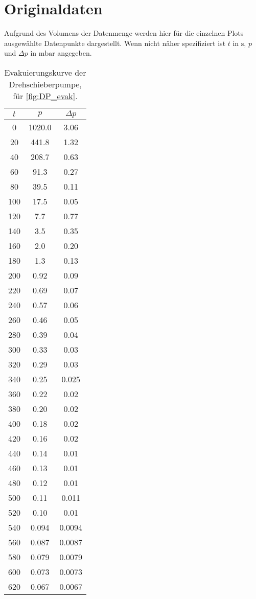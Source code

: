 \section{Originaldaten}
\label{sec:Originaldaten}

Aufgrund des Volumens der Datenmenge werden hier für die einzelnen Plots ausgewählte Datenpunkte dargestellt.
Wenn nicht näher spezifiziert ist $t$ in $\si{\second}$, $p$ und $\Delta p$ in $\si{\milli\bar}$ angegeben. 

\begin{table}[H]
    \centering
    \caption{Evakuierungskurve der Drehschieberpumpe, für  \autoref{fig:DP_evak}.}
    \label{tab:DP_Evak}
    \begin{tabular}{c c c}
        \toprule
        {$t$} & {$p$} & {$\Delta p$} \\
        \midrule
        0 & 1020.0 & 3.06\\
        20 & 441.8 & 1.32\\
        40 & 208.7 & 0.63\\
        60 & 91.3 & 0.27\\
        80 & 39.5 & 0.11\\
        100 & 17.5 & 0.05\\
        120 & 7.7 & 0.77\\
        140 & 3.5 & 0.35\\
        160 & 2.0 & 0.20\\
        180 & 1.3 & 0.13\\
        200 & 0.92 & 0.09\\
        220 & 0.69 & 0.07\\
        240 & 0.57 & 0.06\\
        260 & 0.46 & 0.05\\
        280 & 0.39 & 0.04\\
        300 & 0.33 & 0.03\\
        320 & 0.29 & 0.03\\
        340 & 0.25 & 0.025\\
        360 & 0.22 & 0.02\\
        380 & 0.20 & 0.02\\
        400 & 0.18 & 0.02\\
        420 & 0.16 & 0.02\\
        440 & 0.14 & 0.01\\
        460 & 0.13 & 0.01\\
        480 & 0.12 & 0.01\\
        500 & 0.11 & 0.011\\
        520 & 0.10 & 0.01\\
        540 & 0.094 & 0.0094\\
        560 & 0.087 & 0.0087\\
        580 & 0.079 & 0.0079\\
        600 & 0.073 & 0.0073\\
        620 & 0.067 & 0.0067 \\
        \bottomrule
    \end{tabular}
\end{table}

